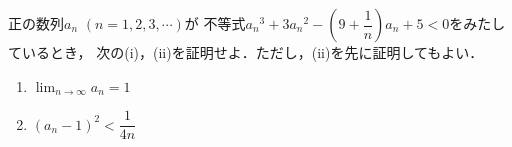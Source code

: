 \documentclass[../../main.tex]{subfiles}
\begin{document}
正の数列$a_n$ $(n=1,2,3,\cdots)$が
不等式$\displaystyle {a_n}^3+3{a_n}^2- \left( 9+\dfrac{1}{n} \right) a_n+5<0$をみたしているとき，
次の(i)，(ii)を証明せよ．ただし，(ii)を先に証明してもよい．
\begin{enumerate}
  \item[(i)] $\displaystyle\lim_{n\to\infty}a_n=1$
  \item[(ii)] $\displaystyle{(a_n-1)}^2<\dfrac{1}{4n}$
\end{enumerate}
\end{document}
